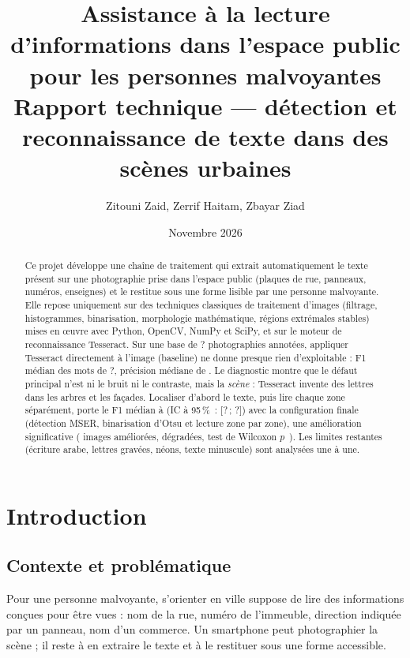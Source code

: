 \documentclass[11pt,a4paper]{article}
\title{\textbf{Assistance à la lecture d'informations dans l'espace public\\pour les personnes malvoyantes}\\[0.4em]
\large Rapport technique — détection et reconnaissance de texte dans des scènes urbaines}
\author{Zitouni Zaid, Zerrif Haitam, Zbayar Ziad}
\date{Novembre 2026}
\newcommand{\nbImages}{?}\newcommand{\configFinale}{?}\newcommand{\baseFmed}{?}%
\newcommand{\finFicBas}{?}\newcommand{\finFicHaut}{?}\newcommand{\finPmed}{?}%
\begin{document}
\maketitle

\begin{abstract}
Ce projet développe une chaîne de traitement qui extrait automatiquement le texte présent sur une photographie prise dans l'espace public (plaques de rue, panneaux, numéros, enseignes) et le restitue sous une forme lisible par une personne malvoyante. Elle repose uniquement sur des techniques classiques de traitement d'images (filtrage, histogrammes, binarisation, morphologie mathématique, régions extrémales stables) mises en œuvre avec Python, OpenCV, NumPy et SciPy, et sur le moteur de reconnaissance Tesseract.
Sur une base de \nbImages{} photographies annotées, appliquer Tesseract directement à l'image (baseline) ne donne presque rien d'exploitable : F1 médian des mots de \baseFmed{}, précision médiane de \basePmed{}. Le diagnostic montre que le défaut principal n'est ni le bruit ni le contraste, mais la \emph{scène} : Tesseract invente des lettres dans les arbres et les façades. Localiser d'abord le texte, puis lire chaque zone séparément, porte le F1 médian à \finFmed{} (IC à 95\,\%~: [\finFicBas\,; \finFicHaut]) avec la configuration finale (détection MSER, binarisation d'Otsu et lecture zone par zone), une amélioration significative (\finMieux{} images améliorées, \finPire{} dégradées, test de Wilcoxon $p$~\finP{}). Les limites restantes (écriture arabe, lettres gravées, néons, texte minuscule) sont analysées une à une.
\end{abstract}

\tableofcontents
\newpage

\section{Introduction}

\subsection{Contexte et problématique}
Pour une personne malvoyante, s'orienter en ville suppose de lire des informations conçues pour être vues : nom de la rue, numéro de l'immeuble, direction indiquée par un panneau, nom d'un commerce. Un smartphone peut photographier la scène ; il reste à en extraire le texte et à le restituer sous une forme accessible.
\end{document}
